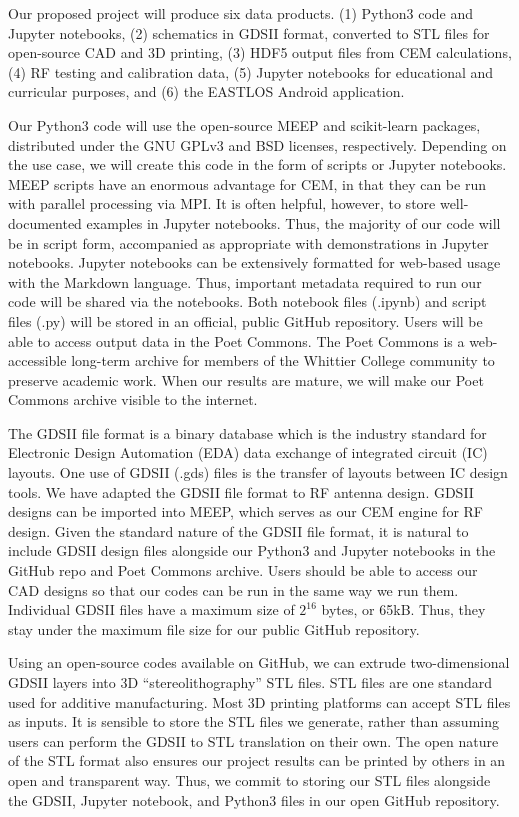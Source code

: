 \documentclass[11pt]{amsart}
\begin{document}
Our proposed project will produce six data products. (1) Python3 code and Jupyter notebooks, (2) schematics in GDSII format, converted to STL files for open-source CAD and 3D printing, (3) HDF5 output files from CEM calculations, (4) RF testing and calibration data, (5) Jupyter notebooks for educational and curricular purposes, and (6) the EASTLOS Android application. 

Our Python3 code will use the open-source MEEP and scikit-learn packages, distributed under the GNU GPLv3 and BSD licenses, respectively.  Depending on the use case, we will create this code in the form of scripts or Jupyter notebooks.  MEEP scripts have an enormous advantage for CEM, in that they can be run with parallel processing via MPI.  It is often helpful, however, to store well-documented examples in Jupyter notebooks.  Thus, the majority of our code will be in script form, accompanied as appropriate with demonstrations in Jupyter notebooks.  Jupyter notebooks can be extensively formatted for web-based usage with the Markdown language.  Thus, important metadata required to run our code will be shared via the notebooks.  Both notebook files (.ipynb) and script files (.py) will be stored in an official, public GitHub repository.  Users will be able to access output data in the Poet Commons.  The Poet Commons is a web-accessible long-term archive for members of the Whittier College community to preserve academic work.  When our results are mature, we will make our Poet Commons archive visible to the internet.

The GDSII file format is a binary database which is the industry standard for Electronic Design Automation (EDA) data exchange of integrated circuit (IC) layouts.  One use of GDSII (.gds) files is the transfer of layouts between IC design tools.  We have adapted the GDSII file format to RF antenna design.  GDSII designs can be imported into MEEP, which serves as our CEM engine for RF design.  Given the standard nature of the GDSII file format, it is natural to include GDSII design files alongside our Python3 and Jupyter notebooks in the GitHub repo and Poet Commons archive.  Users should be able to access our CAD designs so that our codes can be run in the same way we run them.  Individual GDSII files have a maximum size of $2^{16}$ bytes, or 65kB.  Thus, they stay under the maximum file size for our public GitHub repository. 

Using an open-source codes available on GitHub, we can extrude two-dimensional GDSII layers into 3D ``stereolithography'' STL files.  STL files are one standard used for additive manufacturing.  Most 3D printing platforms can accept STL files as inputs.  It is sensible to store the STL files we generate, rather than assuming users can perform the GDSII to STL translation on their own.  The open nature of the STL format also ensures our project results can be printed by others in an open and transparent way.  Thus, we commit to storing our STL files alongside the GDSII, Jupyter notebook, and Python3 files in our open GitHub repository. 
\end{document}
